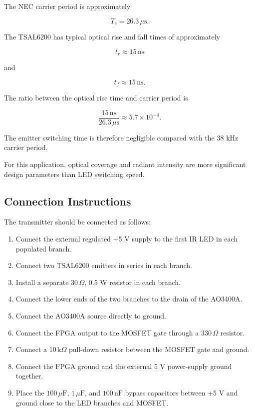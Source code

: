 \documentclass[a4paper,12pt]{article}
\begin{document}
The NEC carrier period is approximately

\[
T_c = 26.3\,\mu\text{s}.
\]

The TSAL6200 has typical optical rise and fall times of approximately

\[
t_r \approx 15\,\text{ns}
\]

and

\[
t_f \approx 15\,\text{ns}.
\]

The ratio between the optical rise time and carrier period is

\[
\frac{
15\,\text{ns}
}{
26.3\,\mu\text{s}
}
\approx
5.7\times10^{-4}.
\]

The emitter switching time is therefore negligible compared with the
38 kHz carrier period.

For this application, optical coverage and radiant intensity are more
significant design parameters than LED switching speed.



\subsection{Connection Instructions}

The transmitter should be connected as follows:

\begin{enumerate}

    \item Connect the external regulated +5 V supply to the first IR
    LED in each populated branch.

    \item Connect two TSAL6200 emitters in series in each branch.

    \item Install a separate \(30\,\Omega\), 0.5 W resistor in each
    branch.

    \item Connect the lower ends of the two branches to the drain of
    the AO3400A.

    \item Connect the AO3400A source directly to ground.

    \item Connect the FPGA output to the MOSFET gate through a
    \(330\,\Omega\) resistor.

    \item Connect a \(10\,\text{k}\Omega\) pull-down resistor between
    the MOSFET gate and ground.

    \item Connect the FPGA ground and the external 5 V power-supply
    ground together.

    \item Place the \(100\,\mu\text{F}\), \(1\,\mu\text{F}\), and
    \(100\,\text{nF}\) bypass capacitors between +5 V and ground close
    to the LED branches and MOSFET.

\end{enumerate}
\end{document}

